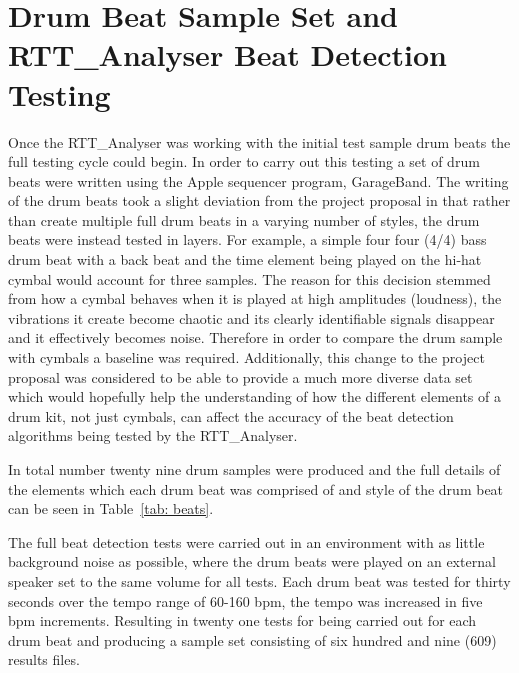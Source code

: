 \documentclass[a4paper, 11pt]{article}
\begin{document}
\maketitle{}\section{Drum Beat Sample Set and RTT\_Analyser Beat Detection Testing}
Once the RTT\_Analyser was working with the initial test sample drum beats the full testing cycle could begin. In order to carry out this testing a set of drum beats were written using the Apple sequencer program, GarageBand\cite{garage}. The writing of the drum beats took a slight deviation from the project proposal in that rather than create multiple full drum beats in a varying number of styles, the drum beats were instead tested in layers. For example, a simple four four (4/4) bass drum beat with a back beat and the time element being played on the hi-hat cymbal would account for three samples. The reason for this decision stemmed from how a cymbal behaves when it is played at high amplitudes (loudness), the vibrations it create become chaotic and its clearly identifiable signals disappear and it effectively becomes noise\cite{soundonsound}. Therefore in order to compare the drum sample with cymbals a baseline was required. Additionally, this change to the project proposal was considered to be able to provide a much more diverse data set which would hopefully help the understanding of how the different elements of a drum kit, not just cymbals, can affect the accuracy of the beat detection algorithms being tested by the RTT\_Analyser.\par

In total number twenty nine drum samples were produced and the full details of the elements which each drum beat was comprised of and style of the drum beat can be seen in Table~\ref{tab: beats}.

The full beat detection tests were carried out in an environment with as little background noise as possible, where the drum beats were played on an external speaker set to the same volume for all tests. Each drum beat was tested for thirty seconds over the tempo range of 60-160 bpm, the tempo was increased in five bpm increments. Resulting in twenty one tests for being carried out for each drum beat and producing a sample set consisting of six hundred and nine (609) results files.
\end{document}
